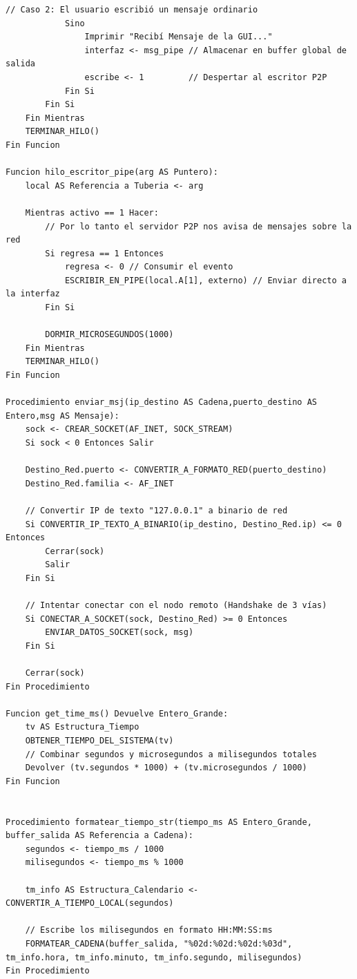 \begin{lstlisting}[style=estiloPseudo]
            // Caso 2: El usuario escribió un mensaje ordinario
            Sino
                Imprimir "Recibí Mensaje de la GUI..."
                interfaz <- msg_pipe // Almacenar en buffer global de salida
                escribe <- 1         // Despertar al escritor P2P
            Fin Si
        Fin Si
    Fin Mientras
    TERMINAR_HILO()
Fin Funcion

Funcion hilo_escritor_pipe(arg AS Puntero):
    local AS Referencia a Tuberia <- arg

    Mientras activo == 1 Hacer:
        // Por lo tanto el servidor P2P nos avisa de mensajes sobre la red
        Si regresa == 1 Entonces
            regresa <- 0 // Consumir el evento
            ESCRIBIR_EN_PIPE(local.A[1], externo) // Enviar directo a la interfaz
        Fin Si
        
        DORMIR_MICROSEGUNDOS(1000)
    Fin Mientras
    TERMINAR_HILO()
Fin Funcion

Procedimiento enviar_msj(ip_destino AS Cadena,puerto_destino AS Entero,msg AS Mensaje):
    sock <- CREAR_SOCKET(AF_INET, SOCK_STREAM)
    Si sock < 0 Entonces Salir

    Destino_Red.puerto <- CONVERTIR_A_FORMATO_RED(puerto_destino)
    Destino_Red.familia <- AF_INET
    
    // Convertir IP de texto "127.0.0.1" a binario de red
    Si CONVERTIR_IP_TEXTO_A_BINARIO(ip_destino, Destino_Red.ip) <= 0 Entonces
        Cerrar(sock)
        Salir
    Fin Si

    // Intentar conectar con el nodo remoto (Handshake de 3 vías)
    Si CONECTAR_A_SOCKET(sock, Destino_Red) >= 0 Entonces
        ENVIAR_DATOS_SOCKET(sock, msg)
    Fin Si

    Cerrar(sock)
Fin Procedimiento

Funcion get_time_ms() Devuelve Entero_Grande:
    tv AS Estructura_Tiempo
    OBTENER_TIEMPO_DEL_SISTEMA(tv)
    // Combinar segundos y microsegundos a milisegundos totales
    Devolver (tv.segundos * 1000) + (tv.microsegundos / 1000)
Fin Funcion


Procedimiento formatear_tiempo_str(tiempo_ms AS Entero_Grande, buffer_salida AS Referencia a Cadena):
    segundos <- tiempo_ms / 1000
    milisegundos <- tiempo_ms % 1000
    
    tm_info AS Estructura_Calendario <- CONVERTIR_A_TIEMPO_LOCAL(segundos)
    
    // Escribe los milisegundos en formato HH:MM:SS:ms
    FORMATEAR_CADENA(buffer_salida, "%02d:%02d:%02d:%03d", tm_info.hora, tm_info.minuto, tm_info.segundo, milisegundos)
Fin Procedimiento
\end{lstlisting}
